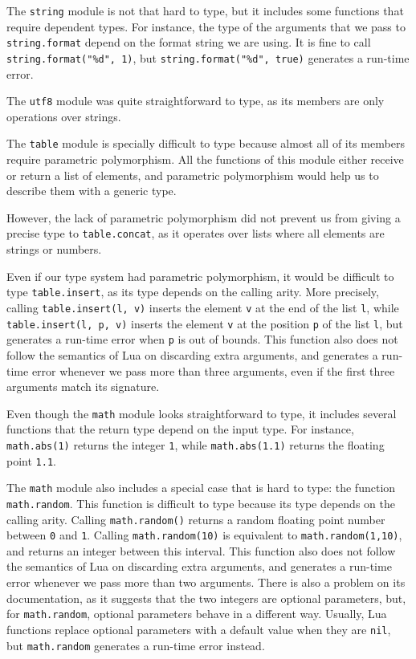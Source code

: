 The \texttt{string} module is not that hard to type, but it includes
some functions that require dependent types.
For instance, the type of the arguments that we pass to
\texttt{string.format} depend on the format string we are using.
It is fine to call \texttt{string.format("\%d", 1)}, but
\texttt{string.format("\%d", true)} generates a run-time error.

The \texttt{utf8} module was quite straightforward to type,
as its members are only operations over strings.

The \texttt{table} module is specially difficult to type because
almost all of its members require parametric polymorphism.
All the functions of this module either receive or return a list
of elements, and parametric polymorphism would help us to describe
them with a generic type.

However, the lack of parametric polymorphism did not prevent us from
giving a precise type to \texttt{table.concat}, as it operates over lists
where all elements are strings or numbers.

Even if our type system had parametric polymorphism, it would
be difficult to type \texttt{table.insert}, as its type depends on
the calling arity.
More precisely, calling \texttt{table.insert(l, v)} inserts the
element \texttt{v} at the end of the list \texttt{l},
while \texttt{table.insert(l, p, v)} inserts the element \texttt{v}
at the position \texttt{p} of the list \texttt{l},
but generates a run-time error when \texttt{p} is out of bounds.
This function also does not follow the semantics of Lua on
discarding extra arguments, and generates a run-time error whenever
we pass more than three arguments, even if the first three arguments
match its signature.

Even though the \texttt{math} module looks straightforward to type,
it includes several functions that the return type depend on the input type.
For instance, \texttt{math.abs(1)} returns the integer \texttt{1},
while \texttt{math.abs(1.1)} returns the floating point \texttt{1.1}.

The \texttt{math} module also includes a special case that is hard to type:
the function \texttt{math.random}.
This function is difficult to type because its type depends on the calling arity.
Calling \texttt{math.random()} returns a random floating point number
between \texttt{0} and \texttt{1}.
Calling \texttt{math.random(10)} is equivalent to \texttt{math.random(1,10)},
and returns an integer between this interval.
This function also does not follow the semantics of Lua on discarding extra arguments,
and generates a run-time error whenever we pass more than two arguments.
There is also a problem on its documentation, as it suggests that
the two integers are optional parameters, but, for \texttt{math.random},
optional parameters behave in a different way.
Usually, Lua functions replace optional parameters with a default value
when they are \texttt{nil}, but \texttt{math.random} generates a run-time
error instead.

